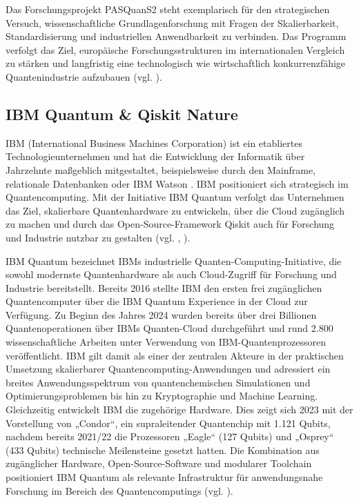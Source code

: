 Das Forschungsprojekt PASQuanS2 steht exemplarisch für den strategischen Versuch, wissenschaftliche Grundlagenforschung mit Fragen der Skalierbarkeit, Standardisierung und industriellen Anwendbarkeit zu verbinden. Das Programm verfolgt das Ziel, europäische Forschungsstrukturen im internationalen Vergleich zu stärken und langfristig eine technologisch wie wirtschaftlich konkurrenzfähige Quantenindustrie aufzubauen (vgl. \cite{vogiatzoglouEUsQuestDigital2025}).
 

\subsection*{IBM Quantum \& Qiskit Nature} 
\label{Chemie_Projekte_IBMQiskit}

IBM (International Business Machines Corporation) ist ein etabliertes Technologieunternehmen und hat die Entwicklung der Informatik über Jahrzehnte maßgeblich mitgestaltet, beispielsweise durch den Mainframe, relationale Datenbanken oder IBM Watson \cite{aruteQuantumSupremacyUsing2019a}. IBM positioniert sich strategisch im Quantencomputing. Mit der Initiative IBM Quantum verfolgt das Unternehmen das Ziel, skalierbare Quantenhardware zu entwickeln, über die Cloud zugänglich zu machen und durch das Open-Source-Framework Qiskit auch für Forschung und Industrie nutzbar zu gestalten (vgl. \cite{maksudul_shadat_akash_quantum_2025},  \cite{miceliQuantumComputationVisualization2018}). 

\vspace{0.5em}

IBM Quantum bezeichnet IBMs industrielle Quanten-Computing-Initiative, die sowohl modernste Quantenhardware als auch Cloud-Zugriff für Forschung und Industrie bereitstellt. Bereits 2016 stellte IBM den ersten frei zugänglichen Quantencomputer über die IBM Quantum Experience in der Cloud zur Verfügung. Zu Beginn des Jahres 2024 wurden bereits über drei Billionen Quantenoperationen über IBMs Quanten-Cloud durchgeführt und rund 2.800 wissenschaftliche Arbeiten unter Verwendung von IBM-Quantenprozessoren veröffentlicht. IBM gilt damit als einer der zentralen Akteure in der praktischen Umsetzung skalierbarer Quantencomputing-Anwendungen und adressiert ein breites Anwendungsspektrum von quantenchemischen Simulationen und Optimierungsproblemen bis hin zu Kryptographie und Machine Learning. Gleichzeitig entwickelt IBM die zugehörige Hardware. Dies zeigt sich 2023 mit der Vorstellung von „Condor“, ein supraleitender Quantenchip mit 1.121 Qubits, nachdem bereits 2021/22 die Prozessoren „Eagle“ (127 Qubits) und „Osprey“ (433 Qubits) technische Meilensteine gesetzt hatten. Die Kombination aus zugänglicher Hardware, Open-Source-Software und modularer Toolchain positioniert IBM Quantum als relevante Infrastruktur für anwendungsnahe Forschung im Bereich des Quantencomputings (vgl. \cite{abughanemIBMQuantumComputers2025}).

